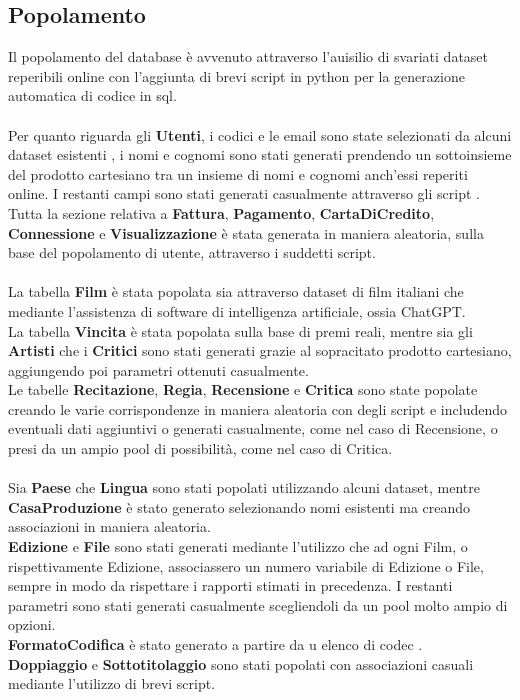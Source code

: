 \documentclass{article}
\begin{document}
\subsection{Popolamento}
Il popolamento del database è avvenuto attraverso l'auisilio di svariati dataset reperibili online con l'aggiunta di brevi script in python per la generazione automatica di codice in sql. \\ \\
Per quanto riguarda gli \textbf{Utenti}, i codici e le email sono state selezionati da alcuni dataset esistenti \cite{nomi}, i nomi e cognomi sono stati generati prendendo un sottoinsieme del prodotto cartesiano tra un insieme di nomi e cognomi anch'essi reperiti online. I restanti campi sono stati generati casualmente attraverso gli script \cite{passmail}. \\ 
Tutta la sezione relativa a \textbf{Fattura}, \textbf{Pagamento}, \textbf{CartaDiCredito}, \textbf{Connessione} e \textbf{Visualizzazione} è stata generata in maniera aleatoria, sulla base del popolamento di utente, attraverso i suddetti script. \\ \\ 
La tabella \textbf{Film} è stata popolata sia attraverso dataset di film italiani che mediante l'assistenza di software di intelligenza artificiale, ossia ChatGPT. \\
La tabella \textbf{Vincita} è stata popolata sulla base di premi reali, mentre sia gli \textbf{Artisti} che i \textbf{Critici} sono stati generati grazie al sopracitato prodotto cartesiano, aggiungendo poi parametri ottenuti casualmente. \\
Le tabelle \textbf{Recitazione}, \textbf{Regia}, \textbf{Recensione} e \textbf{Critica} sono state popolate creando le varie corrispondenze in maniera aleatoria con degli script e includendo eventuali dati aggiuntivi o generati casualmente, come nel caso di Recensione, o presi da un ampio pool di possibilità, come nel caso di Critica. \\ \\
Sia \textbf{Paese} che \textbf{Lingua} sono stati popolati utilizzando alcuni dataset, mentre \textbf{CasaProduzione} è stato generato selezionando nomi esistenti ma creando associazioni in maniera aleatoria. \\
\textbf{Edizione} e \textbf{File} sono stati generati mediante l'utilizzo che ad ogni Film, o rispettivamente Edizione, associassero un numero variabile di Edizione o File, sempre in modo da rispettare i rapporti stimati in precedenza. I restanti parametri sono stati generati casualmente scegliendoli da un pool molto ampio di opzioni. \\ 
\textbf{FormatoCodifica} è stato generato a partire da u elenco di codec \cite{codecs}. \\
\textbf{Doppiaggio} e \textbf{Sottotitolaggio} sono stati popolati con associazioni casuali mediante l'utilizzo di brevi script.
\end{document}
